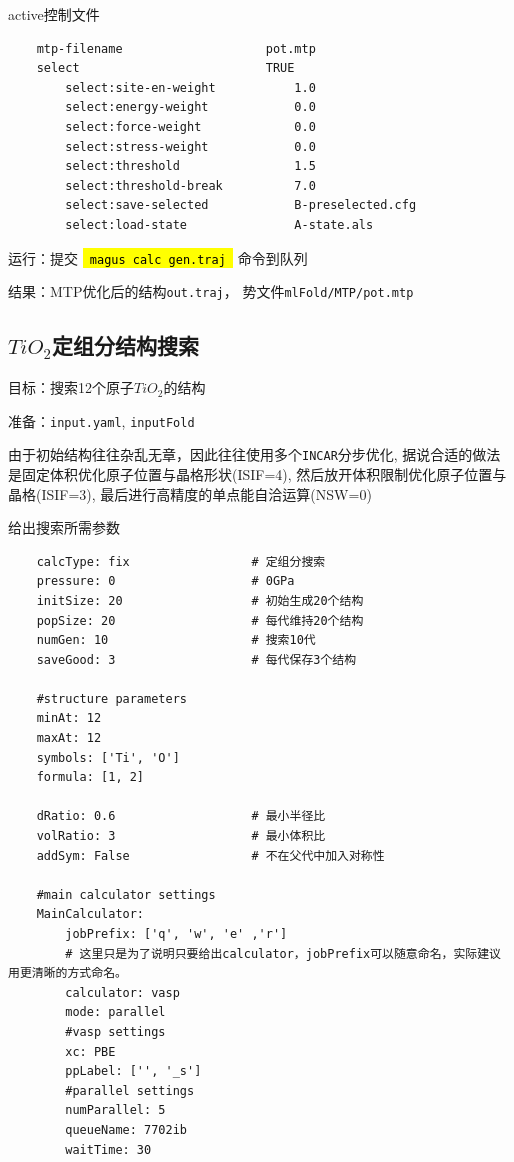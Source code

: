 \documentclass[12pt]{article}
\newcommand{\code}[1]{
  \begingroup
  \sethlcolor{Seashell}
  {\hl{\texttt{~#1~}}}
  \endgroup
}
\newcommand{\file}[1]{\texttt{#1}}
\begin{document}
\begin{tcolorbox}[enhanced, breakable, title = {\file{mlip.ini}}]
    active控制文件
    \tcblower
    \begin{verbatim}
    mtp-filename                    pot.mtp                                               
    select                          TRUE               
        select:site-en-weight           1.0                  
        select:energy-weight            0.0                  
        select:force-weight             0.0                
        select:stress-weight            0.0                 
        select:threshold                1.5                
        select:threshold-break          7.0               
        select:save-selected            B-preselected.cfg   
        select:load-state               A-state.als        
    \end{verbatim}
\end{tcolorbox}
运行：提交\code{magus calc gen.traj}命令到队列\par
结果：MTP优化后的结构\file{out.traj}，
势文件\file{mlFold/MTP/pot.mtp}
\subsection{\texorpdfstring{$TiO_2$定组分结构搜索}{TiO2定组分结构搜索}} \label{fixsearch}
目标：搜索12个原子$TiO_2$的结构\par
准备：\file{input.yaml}, \file{inputFold}\par
由于初始结构往往杂乱无章，因此往往使用多个\file{INCAR}分步优化,
据说合适的做法是固定体积优化原子位置与晶格形状(ISIF=4),
然后放开体积限制优化原子位置与晶格(ISIF=3), 
最后进行高精度的单点能自洽运算(NSW=0)
\begin{tcolorbox}[enhanced, breakable, title = {\file{input.yaml}}]
    给出搜索所需参数
    \tcblower
    \begin{verbatim}
    calcType: fix                 # 定组分搜索
    pressure: 0                   # 0GPa
    initSize: 20                  # 初始生成20个结构
    popSize: 20                   # 每代维持20个结构
    numGen: 10                    # 搜索10代                                                                                      
    saveGood: 3                   # 每代保存3个结构

    #structure parameters
    minAt: 12                     
    maxAt: 12
    symbols: ['Ti', 'O']
    formula: [1, 2]

    dRatio: 0.6                   # 最小半径比
    volRatio: 3                   # 最小体积比
    addSym: False                 # 不在父代中加入对称性

    #main calculator settings
    MainCalculator:
        jobPrefix: ['q', 'w', 'e' ,'r']
        # 这里只是为了说明只要给出calculator，jobPrefix可以随意命名，实际建议用更清晰的方式命名。
        calculator: vasp
        mode: parallel
        #vasp settings
        xc: PBE 
        ppLabel: ['', '_s']
        #parallel settings
        numParallel: 5
        queueName: 7702ib
        waitTime: 30
    \end{verbatim}
    \end{tcolorbox}
\end{document}
